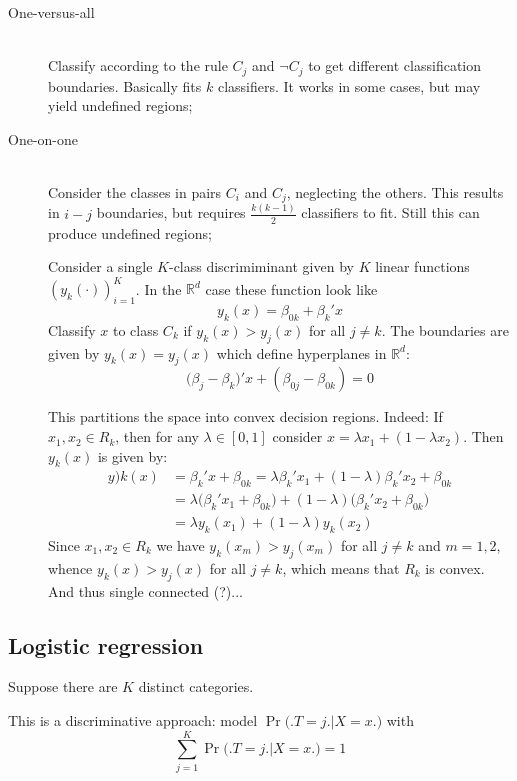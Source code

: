 \documentclass[a4paper]{article}
\newcommand{\clo}[1]{{\left [ #1 \right ]}}
\newcommand{\brac}[1]{{\left ( #1 \right )}}
\newcommand{\Real}{\mathbb{R}}
\begin{document}
\begin{description}
	\item[One-versus-all]\hfill\\
		Classify according to the rule $C_j$ and $\neg C_j$ to get different classification boundaries.
		Basically fits $k$ classifiers. It works in some cases, but may yield undefined regions;
	\item[One-on-one] \hfill\\
		Consider the classes in pairs $C_i$ and $C_j$, neglecting the others. This results in $i-j$ boundaries,
		but requires $\frac{k(k-1)}{2}$ classifiers to fit. Still this can produce undefined regions;
	\item[]
	Consider a single $K$-class discrimiminant given by $K$ linear functions $\brac{y_k(\cdot)}_{i=1}^K$.
	In the $\Real^d$ case these function look like 
	\[y_k(x) = \beta_{0k} + \beta_k'x\]
	Classify $x$ to class $C_k$ if $y_k(x) > y_j(x)$ for all $j\neq k$.
	The boundaries are given by $y_k(x) = y_j(x)$ which define hyperplanes in $\Real^d$:
	\[\big(\beta_j-\beta_k\big)'x + (\beta_{0j}-\beta_{0k}) = 0\]

	This partitions the space into convex decision regions. Indeed:
	If $x_1,x_2\in R_k$, then for any $\lambda\in \clo{0,1}$ consider $x = \lambda x_1 + (1-\lambda x_2)$.
	Then $y_k(x)$ is given by:
	\begin{align*}
		y)k(x) &= \beta_k'x +\beta_{0k} = \lambda\beta_k'x_1 + (1-\lambda)\beta_k'x_2 + \beta_{0k} \\
		& = \lambda\big(\beta_k'x_1 +\beta_{0k}\big) + (1-\lambda)\big(\beta_k'x_2 +\beta_{0k}\big) \\
		& = \lambda y_k(x_1) + (1-\lambda)y_k(x_2)
	\end{align*}
	Since $x_1, x_2\in R_k$ we have $y_k(x_m)>y_j(x_m)$ for all $j\neq k$ and $m=1,2$, whence
	$y_k(x) > y_j(x)$ for all $j\neq k$, which means that $R_k$ is convex. And thus single connected (?)...
\end{description}


\subsection{Logistic regression} %
\label{sub:logistic_regression}

Suppose there are $K$ distinct categories.

This is a discriminative approach: model $\Pr\big(\big. T=j\big.\big\rvert X=x\big.\big)$ with
\[\sum_{j=1}^K \Pr\big(\big. T=j\big.\big\rvert X=x\big.\big) = 1\]
\end{document}
